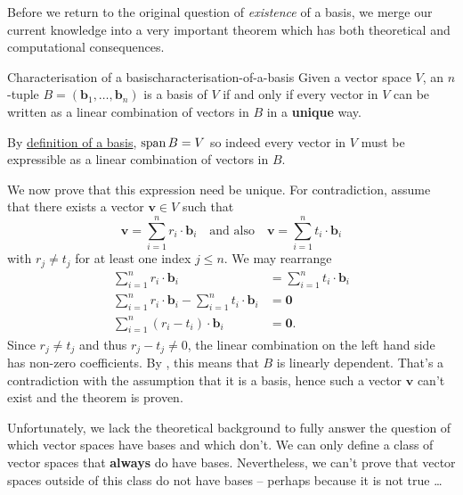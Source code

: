 Before we return to the original question of \emph{existence} of a basis, we
merge our current knowledge into a very important theorem which has both
theoretical and computational consequences.

\begin{theorem}{Characterisation of a basis}{characterisation-of-a-basis}
 Given a vector space $V$, an $n$-tuple $B = (\mathbf{b}_1,\ldots,\mathbf{b}_n)$
 is a basis of $V$ if and only if every vector in $V$ can be written as a linear
 combination of vectors in $B$ in a \textbf{unique} way.
\end{theorem}
\begin{thmproof}
 By \hyperref[def:basis]{definition of a basis}, $\operatorname{span} B = V$ so indeed every
 vector in $V$ must be expressible as a linear combination of vectors in $B$.

 We now prove that this expression need be unique. For contradiction, assume
 that there exists a vector $\mathbf{v} \in V$ such that
 \[
  \mathbf{v} = \sum_{i=1}^{n} r_i \cdot \mathbf{b}_i \quad \text{and also} \quad
  \mathbf{v} = \sum_{i=1}^{n} t_i \cdot \mathbf{b}_i
 \]
 with $r_j \neq t_j$ for at least one index $j \leq n$. We may rearrange
 \begin{align*}
  \sum_{i = 1}^{n} r_i \cdot \mathbf{b}_i &= \sum_{i = 1}^{n} t_i \cdot
  \mathbf{b}_i\\
  \sum_{i = 1}^{n} r_i \cdot \mathbf{b}_i - \sum_{i = 1}^{n} t_i \cdot
  \mathbf{b}_i &= \mathbf{0}\\
  \sum_{i = 1}^{n} (r_i - t_i) \cdot \mathbf{b}_i &= \mathbf{0}.
 \end{align*}
 Since $r_j \neq t_j$ and thus $r_j - t_j \neq 0$, the linear combination on the
 left hand side has non-zero coefficients. By
 , this means that $B$
 is linearly dependent. That's a contradiction with the assumption that it is a
 basis, hence such a vector $\mathbf{v}$ can't exist and the theorem is proven.
\end{thmproof}

Unfortunately, we lack the theoretical background to fully answer the question
of which vector spaces have bases and which don't. We can only define a class of
vector spaces that \textbf{always} do have bases. Nevertheless, we can't prove
that vector spaces outside of this class do not have bases -- perhaps because it
is not true \dots

